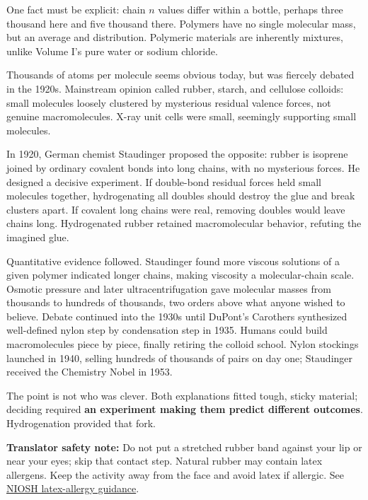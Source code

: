 One fact must be explicit: chain $n$ values differ within a bottle, perhaps three thousand here and five thousand there. Polymers have no single molecular mass, but an average and distribution. Polymeric materials are inherently mixtures, unlike Volume I's pure water or sodium chloride.

\begin{zhengju}
Thousands of atoms per molecule seems obvious today, but was fiercely debated in the 1920s. Mainstream opinion called rubber, starch, and cellulose colloids: small molecules loosely clustered by mysterious residual valence forces, not genuine macromolecules. X-ray unit cells were small, seemingly supporting small molecules.

In 1920, German chemist Staudinger proposed the opposite: rubber is isoprene joined by ordinary covalent bonds into long chains, with no mysterious forces. He designed a decisive experiment. If double-bond residual forces held small molecules together, hydrogenating all doubles should destroy the glue and break clusters apart. If covalent long chains were real, removing doubles would leave chains long. Hydrogenated rubber retained macromolecular behavior, refuting the imagined glue.

Quantitative evidence followed. Staudinger found more viscous solutions of a given polymer indicated longer chains, making viscosity a molecular-chain scale. Osmotic pressure and later ultracentrifugation gave molecular masses from thousands to hundreds of thousands, two orders above what anyone wished to believe. Debate continued into the 1930s until DuPont's Carothers synthesized well-defined nylon step by condensation step in 1935. Humans could build macromolecules piece by piece, finally retiring the colloid school. Nylon stockings launched in 1940, selling hundreds of thousands of pairs on day one; Staudinger received the Chemistry Nobel in 1953.

The point is not who was clever. Both explanations fitted tough, sticky material; deciding required \textbf{an experiment making them predict different outcomes}. Hydrogenation provided that fork.
\end{zhengju}

\textbf{Translator safety note:} Do not put a stretched rubber band against your lip or near your eyes; skip that contact step. Natural rubber may contain latex allergens. Keep the activity away from the face and avoid latex if allergic. See \href{https://www.cdc.gov/niosh/docs/2012-119/default.html}{NIOSH latex-allergy guidance}.


